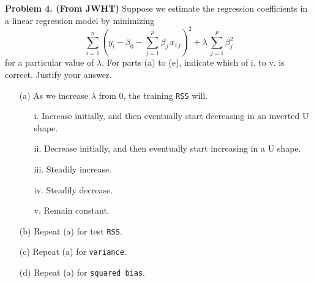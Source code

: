 \documentclass[11pt]{report}
\begin{document}
\noindent
{\bf Problem 4. (From JWHT)} Suppose we estimate the regression coefficients in  a linear regression model by minimizing
$$\sum\limits_{i=1}^n \left( y_i-\beta_0-\sum\limits_{j=1}^p\beta_j\,x_{i\,j}\right)^2+\lambda\,\sum\limits_{j=1}^p\beta_j^2$$
for a particular value of $\lambda$. For parts (a) to (e), indicate which of i. to v. is correct. Justify your answer. 
\begin{itemize}
\item[(a) ] As we increase $\lambda$ from 0, the training {\tt RSS} will. 
\begin{itemize}
\item[i. ] Increase initially, and then eventually start decreasing in an inverted U shape.  
\item[ii. ] Decrease initially, and then eventually start increasing in a U shape. 
\item[iii. ] Steadily increase.
\item[iv. ] Steadily decrease. 
\item[v. ] Remain constant.  
\end{itemize}
\item[(b) ] Repeat (a) for test {\tt RSS}.
\item[(c) ] Repeat (a) for {\tt variance}.
\item[(d) ] Repeat (a) for {\tt squared bias}.
\end{itemize}
\end{document}
